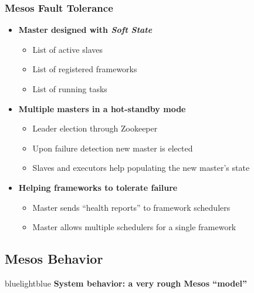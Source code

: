 \begin{frame}
\frametitle{Mesos Fault Tolerance}
\begin{itemize}
	\item {\bf Master designed with {\it Soft State}}
	\begin{itemize}
		\item List of active slaves
		\item List of registered frameworks
		\item List of running tasks
	\end{itemize}
	\item {\bf Multiple masters in a hot-standby mode}
	\begin{itemize}
		\item Leader election through Zookeeper
		\item Upon failure detection new master is elected
		\item Slaves and executors help populating the new master's state
	\end{itemize}
	\item {\bf Helping frameworks to tolerate failure}
	\begin{itemize}
		\item Master sends ``health reports'' to framework schedulers
		\item Master allows multiple schedulers for a single framework
	\end{itemize}
\end{itemize}
\end{frame}

\subsection{Mesos Behavior}
\begin{frame}
 \begin{colorblock}{blue}{lightblue}{ }
    \Large \textbf{System behavior: a very rough Mesos ``model''}
  \end{colorblock}
\end{frame}

